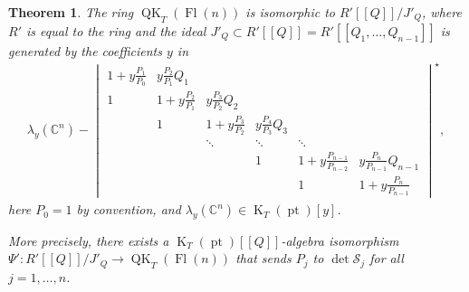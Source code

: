 \documentclass[pdftex]{sigma}
\numberwithin{equation}{section}
\newtheorem{Theorem}{Theorem}[section]
\theoremstyle{definition}
\newcommand{\dbb}[1]{[\![#1]\!]}
\DeclareMathOperator{\Fl}{Fl}
\DeclareMathOperator{\QK}{QK}
\DeclareMathOperator{\K}{K}
\DeclareMathOperator{\pt}{pt}
\newcommand{\C}{{\mathbb C}}
\newcommand{\cS}{{\mathcal S}}
\begin{document}
\begin{Theorem}\label{thm:toda}
The ring $\QK_T(\Fl(n))$ is isomorphic to $R'[\![Q]\!]/J'_Q$, where $R'$ is equal to the ring \smash{$\K_T(\pt)\bigl[P_1^{\pm },\dots,P_{n}^\pm\bigr]$} and the ideal $J'_Q\subset R'\dbb{Q}=R'\dbb{Q_1,\dots,Q_{n-1}}$ is generated by the coefficients $y$ in
 \begin{gather}\label{eqn:toda}
 \lambda_y(\C^n) -
 \begin{vmatrix}
 1+y\frac{P_1}{P_0} & y\frac{P_2}{P_1}Q_1 & & & & \\[0.9mm]
 1 & 1+y\frac{P_2}{P_1} & y\frac{P_3}{P_2}Q_2 & & & \\[0.9mm]
 & 1 & 1+y\frac{P_3}{P_2} & y\frac{P_{4}}{P_{3}}Q_3 & & \\
 & & \ddots & \ddots & \ddots & \\
& & & 1 & 1+y\frac{P_{n-1}}{P_{n-2}} & y\frac{P_n}{P_{n-1}}Q_{n-1}\\[1mm]
& & & & 1 & 1+y\frac{P_n}{P_{n-1}}
\end{vmatrix}^\star,
\end{gather}
here $P_0=1$ by convention, and $\lambda_y(\C^n)\in\K_T(\pt)[y]$.

More precisely,
there exists a $\K_T(\pt)[\![Q]\!]$-algebra isomorphism $\Psi'\colon R'[\![Q]\!]/J'_Q \to \QK_T(\Fl(n))$ that sends $P_j$ to $\det \cS_j$ for all $j=1,\dots,n$.
\end{Theorem}
\end{document}
